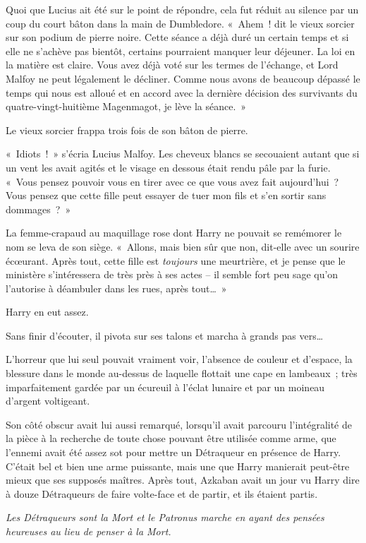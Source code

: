 Quoi que Lucius ait été sur le point de répondre, cela fut réduit au silence par un coup du court bâton dans la main de Dumbledore. «~Ahem~! dit le vieux sorcier sur son podium de pierre noire. Cette séance a déjà duré un certain temps et si elle ne s'achève pas bientôt, certains pourraient manquer leur déjeuner. La loi en la matière est claire. Vous avez déjà voté sur les termes de l'échange, et Lord Malfoy ne peut légalement le décliner. Comme nous avons de beaucoup dépassé le temps qui nous est alloué et en accord avec la dernière décision des survivants du quatre-vingt-huitième Magenmagot, je lève la séance.~»

Le vieux sorcier frappa trois fois de son bâton de pierre.

«~Idiots~!~» s'écria Lucius Malfoy. Les cheveux blancs se secouaient autant que si un vent les avait agités et le visage en dessous était rendu pâle par la furie. «~Vous pensez pouvoir vous en tirer avec ce que vous avez fait aujourd'hui~? Vous pensez que cette fille peut essayer de tuer mon fils et s'en sortir sans dommages~?~»

La femme-crapaud au maquillage rose dont Harry ne pouvait se remémorer le nom se leva de son siège. «~Allons, mais bien sûr que non, dit-elle avec un sourire écœurant. Après tout, cette fille est \emph{toujours} une meurtrière, et je pense que le ministère s'intéressera de très près à ses actes -- il semble fort peu sage qu'on l'autorise à déambuler dans les rues, après tout…~»

Harry en eut assez.

Sans finir d'écouter, il pivota sur ses talons et marcha à grands pas vers…

L'horreur que lui seul pouvait vraiment voir, l'absence de couleur et d'espace, la blessure dans le monde au-dessus de laquelle flottait une cape en lambeaux~; très imparfaitement gardée par un écureuil à l'éclat lunaire et par un moineau d'argent voltigeant.

Son côté obscur avait lui aussi remarqué, lorsqu'il avait parcouru l'intégralité de la pièce à la recherche de toute chose pouvant être utilisée comme arme, que l'ennemi avait été assez sot pour mettre un Détraqueur en présence de Harry. C'était bel et bien une arme puissante, mais une que Harry manierait peut-être mieux que ses supposés maîtres. Après tout, Azkaban avait un jour vu Harry dire à douze Détraqueurs de faire volte-face et de partir, et ils étaient partis.

\emph{Les Détraqueurs sont la Mort et le Patronus marche en ayant des pensées heureuses au lieu de penser à la Mort.}

